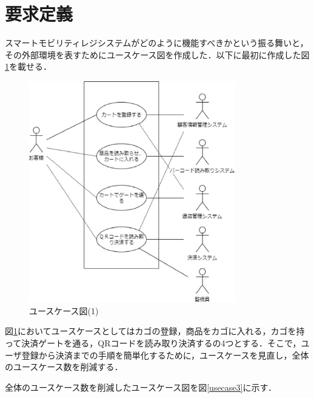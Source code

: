 

\section{要求定義}


スマートモビリティレジシステムがどのように機能すべきかという振る舞いと，その外部環境を表すためにユースケース図を作成した．以下に最初に作成した図\ref{usecase1}を載せる．

\begin{figure}[htbp]
\centering
\includegraphics[width = 9cm]{./picture/usecase1.eps}
\caption{ユースケース図(1)}
\label{usecase1}
\end{figure}


図\ref{usecase1}においてユースケースとしてはカゴの登録，商品をカゴに入れる，カゴを持って決済ゲートを通る，QRコードを読み取り決済するの4つとする．そこで，ユーザ登録から決済までの手順を簡単化するために，ユースケースを見直し，全体のユースケース数を削減する．


全体のユースケース数を削減したユースケース図を図\ref{usecase3}に示す．

